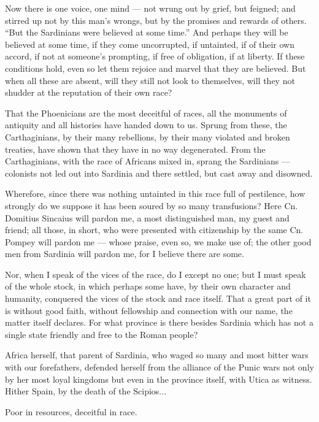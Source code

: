  Now there is one voice, one mind --- not wrung out by grief, but feigned; and stirred up not by this man's wrongs, but by the promises and rewards of others. ``But the Sardinians were believed at some time.'' And perhaps they will be believed at some time, if they come uncorrupted, if untainted, if of their own accord, if not at someone's prompting, if free of obligation, if at liberty. If these conditions hold, even so let them rejoice and marvel that they are believed. But when all these are absent, will they still not look to themselves, will they not shudder at the reputation of their own race?

 That the Phoenicians are the most deceitful of races, all the monuments of antiquity and all histories have handed down to us. Sprung from these, the Carthaginians, by their many rebellions, by their many violated and broken treaties, have shown that they have in no way degenerated. From the Carthaginians, with the race of Africans mixed in, sprang the Sardinians --- colonists not led out into Sardinia and there settled, but cast away and disowned.

 Wherefore, since there was nothing untainted in this race full of pestilence, how strongly do we suppose it has been soured by so many transfusions? Here Cn. Domitius Sincaius will pardon me, a most distinguished man, my guest and friend; all those, in short, who were presented with citizenship by the same Cn. Pompey will pardon me --- whose praise, even so, we make use of; the other good men from Sardinia will pardon me, for I believe there are some.

 Nor, when I speak of the vices of the race, do I except no one; but I must speak of the whole stock, in which perhaps some have, by their own character and humanity, conquered the vices of the stock and race itself. That a great part of it is without good faith, without fellowship and connection with our name, the matter itself declares. For what province is there besides Sardinia which has not a single state friendly and free to the Roman people?

 Africa herself, that parent of Sardinia, who waged so many and most bitter wars with our forefathers, defended herself from the alliance of the Punic wars not only by her most loyal kingdoms but even in the province itself, with Utica as witness. Hither Spain, by the death of the Scipios...

 Poor in resources, deceitful in race.

